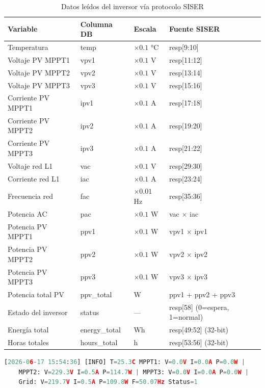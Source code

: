 \documentclass[12pt,a4paper]{article}
\begin{document}
\begin{table}[H]
\centering
\begin{tabular}{llll}
\toprule
\textbf{Variable} & \textbf{Columna DB} & \textbf{Escala} & \textbf{Fuente SISER} \\
\midrule
Temperatura & temp & $\times 0.1$ °C & resp[9:10] \\
Voltaje PV MPPT1 & vpv1 & $\times 0.1$ V & resp[11:12] \\
Voltaje PV MPPT2 & vpv2 & $\times 0.1$ V & resp[13:14] \\
Voltaje PV MPPT3 & vpv3 & $\times 0.1$ V & resp[15:16] \\
Corriente PV MPPT1 & ipv1 & $\times 0.1$ A & resp[17:18] \\
Corriente PV MPPT2 & ipv2 & $\times 0.1$ A & resp[19:20] \\
Corriente PV MPPT3 & ipv3 & $\times 0.1$ A & resp[21:22] \\
Voltaje red L1 & vac & $\times 0.1$ V & resp[29:30] \\
Corriente red L1 & iac & $\times 0.1$ A & resp[23:24] \\
Frecuencia red & fac & $\times 0.01$ Hz & resp[35:36] \\
Potencia AC & pac & $\times 0.1$ W & vac $\times$ iac \\
Potencia PV MPPT1 & ppv1 & $\times 0.1$ W & vpv1 $\times$ ipv1 \\
Potencia PV MPPT2 & ppv2 & $\times 0.1$ W & vpv2 $\times$ ipv2 \\
Potencia PV MPPT3 & ppv3 & $\times 0.1$ W & vpv3 $\times$ ipv3 \\
Potencia total PV & ppv\_total & W & ppv1 + ppv2 + ppv3 \\
Estado del inversor & status & --- & resp[58] (0=espera, 1=normal) \\
Energ\'ia total & energy\_total & Wh & resp[49:52] (32-bit) \\
Horas totales & hours\_total & h & resp[53:56] (32-bit) \\
\bottomrule
\end{tabular}
\caption{Datos le\'idos del inversor v\'ia protocolo SISER}
\end{table}

\begin{lstlisting}[language=Python, caption={Salida t\'ipica del daemon siser-reader en producci\'on}]
[2026-06-17 15:54:36] [INFO] T=25.3C MPPT1: V=0.0V I=0.0A P=0.0W |
    MPPT2: V=229.3V I=0.5A P=114.7W | MPPT3: V=0.0V I=0.0A P=0.0W |
    Grid: V=219.7V I=0.5A P=109.8W F=50.07Hz Status=1
\end{lstlisting}
\end{document}
